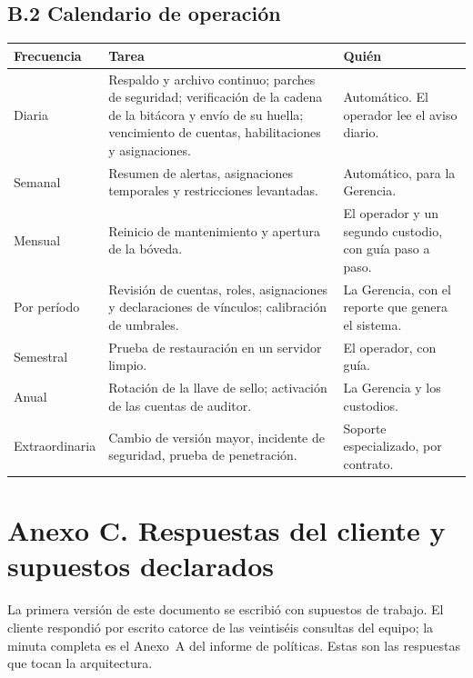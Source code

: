 \documentclass[11pt,letterpaper]{article}
\newcommand{\cab}[1]{\textbf{\rmfamily #1}}
\begin{document}
\subsection*{B.2 Calendario de operación}

\begin{center}
\small
\renewcommand{\arraystretch}{1.22}
\begin{tabularx}{\textwidth}{@{}L{2.4cm} Y L{5.4cm}@{}}
\toprule
\cab{Frecuencia} & \cab{Tarea} & \cab{Quién} \\
\midrule
Diaria & Respaldo y archivo continuo; parches de seguridad; verificación de la cadena de la bitácora y envío de su huella; vencimiento de cuentas, habilitaciones y asignaciones. & Automático. El operador lee el aviso diario. \\
Semanal & Resumen de alertas, asignaciones temporales y restricciones levantadas. & Automático, para la Gerencia. \\
Mensual & Reinicio de mantenimiento y apertura de la bóveda. & El operador y un segundo custodio, con guía paso a paso. \\
Por período & Revisión de cuentas, roles, asignaciones y declaraciones de vínculos; calibración de umbrales. & La Gerencia, con el reporte que genera el sistema. \\
Semestral & Prueba de restauración en un servidor limpio. & El operador, con guía. \\
Anual & Rotación de la llave de sello; activación de las cuentas de auditor. & La Gerencia y los custodios. \\
Extraordinaria & Cambio de versión mayor, incidente de seguridad, prueba de penetración. & Soporte especializado, por contrato. \\
\bottomrule
\end{tabularx}
\end{center}

\section*{Anexo C. Respuestas del cliente y supuestos declarados}

La primera versión de este documento se escribió con supuestos de trabajo. El cliente respondió por
escrito catorce de las veintiséis consultas del equipo; la minuta completa es el Anexo~A del informe
de políticas. Estas son las respuestas que tocan la arquitectura.
\end{document}
